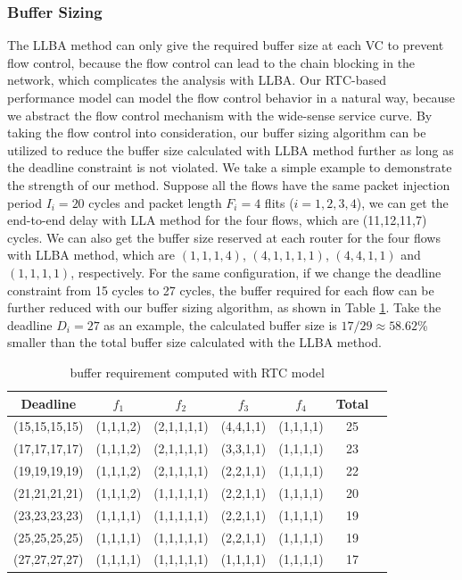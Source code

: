 \documentclass[10pt,journal]{IEEEtran}
\begin{document}
\subsubsection{Buffer Sizing}
The LLBA method \cite{189} can only give the required buffer size at each VC to prevent flow control, because the flow control can lead to the chain blocking in the network, which complicates the analysis with LLBA. Our RTC-based performance model can model the flow control behavior in a natural way, because we abstract the flow control mechanism with the wide-sense service curve. By taking the flow control into consideration, our buffer sizing algorithm can be utilized to reduce the buffer size calculated with LLBA method further as long as the deadline constraint is not violated. We take a simple example to demonstrate the strength of our method. Suppose all the flows have the same packet injection period $I_i=20$ cycles and packet length $F_i=4$ flits ($i=1,2,3,4$), we can get the end-to-end delay with LLA method for the four flows, which are (11,12,11,7) cycles. We can also get the buffer size reserved at each router for the four flows with LLBA method, which are $(1,1,1,4)$, $(4,1,1,1,1)$, $(4,4,1,1)$ and $(1,1,1,1)$, respectively. For the same configuration, if we change the deadline constraint from 15 cycles to 27 cycles, the buffer required for each flow can be further reduced with our buffer sizing algorithm, as shown in Table \ref{LLBAvsRTC}. Take the deadline $D_i=27$ as an example, the calculated buffer size is $17/29\approx58.62$\% smaller than the total buffer size calculated with the LLBA method.
\begin{table}[htbp]
\centering
\caption{\label{LLBAvsRTC}buffer requirement computed with RTC model}
\begin{tabular}{|c|c|c|c|c|c|c|}
\hline
Deadline  & $f_1$  &   $f_2$   &   $f_3$   &   $f_4$   &   Total\\
\hline
(15,15,15,15)   &   (1,1,1,2)   &   (2,1,1,1,1) &   (4,4,1,1)   &   (1,1,1,1)   &   25\\
\hline
(17,17,17,17)   &   (1,1,1,2)   &   (2,1,1,1,1) &   (3,3,1,1)   &   (1,1,1,1)   &   23\\
\hline
(19,19,19,19)   &   (1,1,1,2)   &   (2,1,1,1,1) &   (2,2,1,1)   &   (1,1,1,1)   &   22\\
\hline
(21,21,21,21)   &   (1,1,1,2)   &   (1,1,1,1,1) &   (2,2,1,1)   &   (1,1,1,1)   &   20\\
\hline
(23,23,23,23)   &   (1,1,1,1)   &   (1,1,1,1,1) &   (2,2,1,1)   &   (1,1,1,1)   &   19\\
\hline
(25,25,25,25)   &   (1,1,1,1)   &   (1,1,1,1,1) &   (2,2,1,1)   &   (1,1,1,1)   &   19\\
\hline
(27,27,27,27)   &   (1,1,1,1)   &   (1,1,1,1,1) &   (1,1,1,1)   &   (1,1,1,1)   &   17\\
\hline
\end{tabular}
\end{table}
\end{document}
